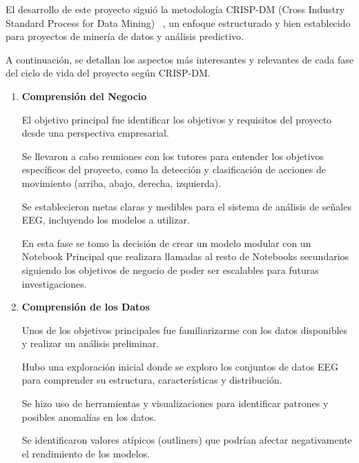 



El desarrollo de este proyecto siguió la metodología CRISP-DM (Cross Industry Standard Process for Data Mining) ~\cite{wiki:CRISP}, un enfoque estructurado y bien establecido para proyectos de minería de datos y análisis predictivo. 

A continuación, se detallan los aspectos más interesantes y relevantes de cada fase del ciclo de vida del proyecto según CRISP-DM.


\begin{enumerate}
\def\labelenumi{\arabic{enumi}.}	
\item
\textbf{Comprensión del Negocio}

El objetivo principal fue identificar los objetivos y requisitos del proyecto desde una perspectiva empresarial.

Se llevaron a cabo reuniones con los tutores para entender los objetivos específicos del proyecto, como la detección y clasificación de acciones de movimiento (arriba, abajo, derecha, izquierda).

Se establecieron metas claras y medibles para el sistema de análisis de señales EEG, incluyendo los modelos a utilizar.

En esta fase se tomo la decisión de crear un modelo modular con un Notebook Principal que realizara llamadas al resto de Notebooks secundarios siguiendo los objetivos de negocio de poder ser escalables para futuras investigaciones.


\item
\textbf{Comprensión de los Datos}

Unos de los objetivos principales fue familiarizarme con los datos disponibles y realizar un análisis preliminar.

Hubo una exploración inicial donde se exploro los conjuntos de datos EEG para comprender su estructura, características y distribución.

Se hizo uso de herramientas y visualizaciones para identificar patrones y posibles anomalías en los datos.

Se identificaron valores atípicos (outliners) que podrían afectar negativamente el rendimiento de los modelos.


\end{enumerate}
